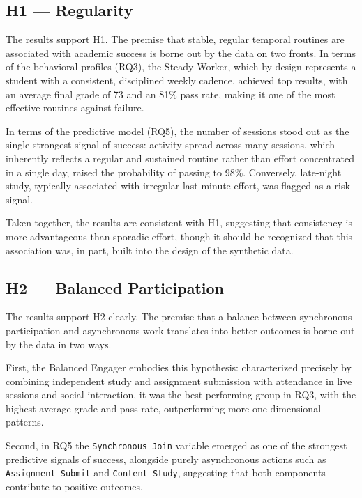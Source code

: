 \subsection{H1 --- Regularity}

The results support H1. The premise that stable, regular temporal routines are associated with academic success is borne out by the data on two fronts. In terms of the behavioral profiles (RQ3), the Steady Worker, which by design represents a student with a consistent, disciplined weekly cadence, achieved top results, with an average final grade of 73 and an 81\% pass rate, making it one of the most effective routines against failure.

In terms of the predictive model (RQ5), the number of sessions stood out as the single strongest signal of success: activity spread across many sessions, which inherently reflects a regular and sustained routine rather than effort concentrated in a single day, raised the probability of passing to 98\%. Conversely, late-night study, typically associated with irregular last-minute effort, was flagged as a risk signal.

Taken together, the results are consistent with H1, suggesting that consistency is more advantageous than sporadic effort, though it should be recognized that this association was, in part, built into the design of the synthetic data.

\subsection{H2 --- Balanced Participation}

The results support H2 clearly. The premise that a balance between synchronous participation and asynchronous work translates into better outcomes is borne out by the data in two ways.

First, the Balanced Engager embodies this hypothesis: characterized precisely by combining independent study and assignment submission with attendance in live sessions and social interaction, it was the best-performing group in RQ3, with the highest average grade and pass rate, outperforming more one-dimensional patterns.

Second, in RQ5 the \texttt{Synchronous\_Join} variable emerged as one of the strongest predictive signals of success, alongside purely asynchronous actions such as \texttt{Assignment\_Submit} and \texttt{Content\_Study}, suggesting that both components contribute to positive outcomes.

